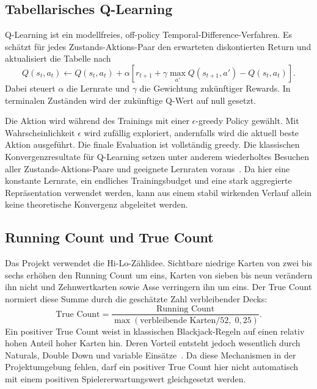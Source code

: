 \subsection{Tabellarisches Q-Learning}

Q-Learning ist ein modellfreies, off-policy
Temporal-Difference-Verfahren. Es schätzt für jedes
Zustands-Aktions-Paar den erwarteten diskontierten Return und
aktualisiert die Tabelle nach~\cite{watkins1992qlearning}
\begin{equation}
  Q(s_t,a_t) \leftarrow Q(s_t,a_t) +
  \alpha\left[r_{t+1}+\gamma\max_{a'}Q(s_{t+1},a')-Q(s_t,a_t)\right].
  \label{eq:qlearning}
\end{equation}
Dabei steuert $\alpha$ die Lernrate und $\gamma$ die Gewichtung
zukünftiger Rewards. In terminalen Zuständen wird der zukünftige
Q-Wert auf null gesetzt.

Die Aktion wird während des Trainings mit einer $\epsilon$-greedy
Policy gewählt. Mit Wahrscheinlichkeit $\epsilon$ wird zufällig
exploriert, andernfalls wird die aktuell beste Aktion ausgeführt. Die
finale Evaluation ist vollständig greedy. Die klassischen
Konvergenzresultate für Q-Learning setzen unter anderem wiederholtes
Besuchen aller Zustands-Aktions-Paare und geeignete Lernraten
voraus~\cite{watkins1992qlearning}. Da hier eine konstante Lernrate,
ein endliches Trainingsbudget und eine stark aggregierte
Repräsentation verwendet werden, kann aus einem stabil wirkenden
Verlauf allein keine theoretische Konvergenz abgeleitet werden.

\subsection{Running Count und True Count}

Das Projekt verwendet die Hi-Lo-Zählidee. Sichtbare niedrige Karten
von zwei bis sechs erhöhen den Running Count um eins, Karten von
sieben bis neun verändern ihn nicht und Zehnwertkarten sowie Asse
verringern ihn um eins. Der True Count normiert diese Summe durch die
geschätzte Zahl verbleibender Decks:
\begin{equation}
  \text{True Count}=\frac{\text{Running
  Count}}{\max(\text{verbleibende Karten}/52,\;0{,}25)}.
\end{equation}
Ein positiver True Count weist in klassischen Blackjack-Regeln auf
einen relativ hohen Anteil hoher Karten hin. Deren Vorteil entsteht
jedoch wesentlich durch Naturals, Double Down und variable
Einsätze~\cite{thorp1961favorable}. Da diese Mechanismen in der
Projektumgebung fehlen, darf ein positiver True Count hier nicht
automatisch mit einem positiven Spielererwartungswert gleichgesetzt werden.
